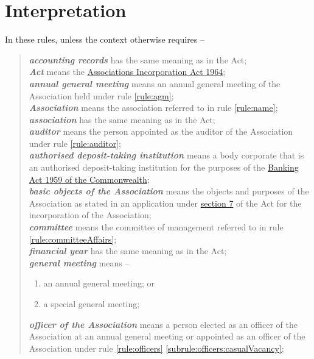 \section{Interpretation}
\label{rule:interpretation}

In these rules, unless the context otherwise requires --
\begin{quote}
	\textit{\textbf{accounting records}} has the same meaning as in the Act;\\
	\textit{\textbf{Act}} means the \href{https://www.legislation.tas.gov.au/view/html/inforce/2019-05-06/act-1964-064}{Associations Incorporation Act 1964};\\
	\textit{\textbf{annual general meeting}} means an annual general meeting of the Association held under rule \ref{rule:agm};\\
	\textit{\textbf{Association}} means the association referred to in rule \ref{rule:name};\\
	\textit{\textbf{association}} has the same meaning as in the Act;\\
	\textit{\textbf{auditor}} means the person appointed as the auditor of the Association under rule \ref{rule:auditor};\\
	\textit{\textbf{authorised deposit-taking institution}} means a body corporate that is an authorised deposit-taking institution for the purposes of the \href{https://www.legislation.gov.au/Details/C2017C00067}{Banking Act 1959 of the Commonwealth};\\
	\textit{\textbf{basic objects of the Association}} means the objects and purposes of the Association as stated in an application under \href{https://www.legislation.tas.gov.au/view/html/inforce/2019-05-06/act-1964-064#GS7@EN}{section 7} of the Act for the incorporation of the Association;\\
	\textit{\textbf{committee}} means the committee of management referred to in rule \ref{rule:committeeAffairs};\\
	\textit{\textbf{financial year}} has the same meaning as in the Act;\\
	\textit{\textbf{general meeting}} means --
	\begin{enumerate}
		\item an annual general meeting; or
		\item a special general meeting;
	\end{enumerate}
	\textit{\textbf{officer of the Association}} means a person elected as an officer of the Association at an annual general meeting or appointed as an officer of the Association under rule \ref{rule:officers} \ref{subrule:officers:casualVacancy};\\

\end{quote}
